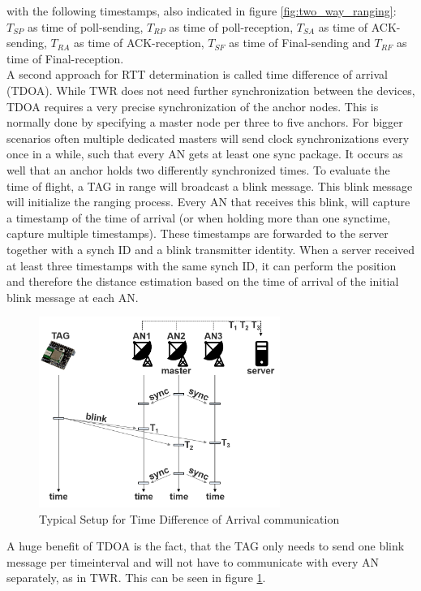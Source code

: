 with the following timestamps, also indicated in figure \ref{fig:two_way_ranging}: $T_{SP}$ as time of poll-sending, $T_{RP}$ as time of poll-reception, $T_{SA}$ as time of ACK-sending, $T_{RA}$ as time of ACK-reception, $T_{SF}$ as time of Final-sending and $T_{RF}$ as time of Final-reception.\\
\noindent\hspace*{5mm}%
A second approach for RTT determination is called time difference of arrival (TDOA). While TWR does not need further synchronization between the devices, TDOA requires a very precise synchronization of the anchor nodes. This is normally done by specifying a master node per three to five anchors. For bigger scenarios often multiple dedicated masters will send clock synchronizations every once in a while, such that every AN gets at least one sync package. It occurs as well that an anchor holds two differently synchronized times.
To evaluate the time of flight, a TAG in range will broadcast a blink message. This blink message will initialize the ranging process. Every AN that receives this blink, will capture a timestamp of the time of arrival (or when holding more than one synctime, capture multiple timestamps). These timestamps are forwarded to the server together with a synch ID and a blink transmitter identity. When a server received at least three timestamps with the same synch ID, it can perform the position and therefore the distance estimation based on the time of arrival of the initial blink message at each AN.
\begin{figure}[th]
\centering
\includegraphics[width=0.7\textwidth]{Figures/time_difference_of_arrival}
\decoRule
\caption[Time Difference of Arrival]{Typical Setup for Time Difference of Arrival communication}
\label{fig:time_difference_of_arrival}
\end{figure}
A huge benefit of TDOA is the fact, that the TAG only needs to send one blink message per timeinterval and will not have to communicate with every AN separately, as in TWR. This can be seen in figure \ref{fig:time_difference_of_arrival}.\\
